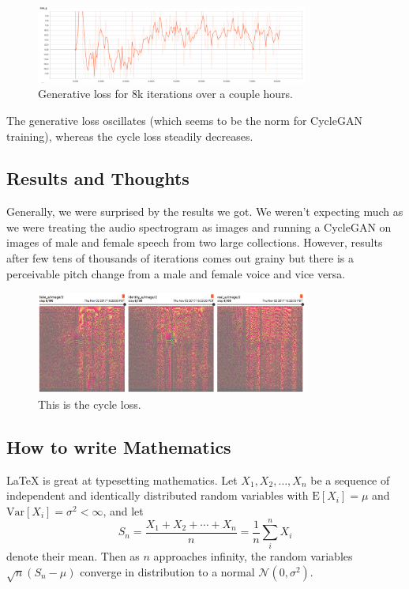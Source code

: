 \documentclass[a4paper]{article}
\begin{document}
\begin{figure}[!htb]
\centering
\includegraphics[width=0.8\textwidth]{cyclegan_genloss.png}
\caption{\label{fig:genloss}Generative loss for 8k iterations over a couple hours.}
\end{figure}

The generative loss oscillates (which seems to be the norm for CycleGAN training), whereas the cycle loss steadily decreases.

\subsection{Results and Thoughts}
Generally, we were surprised by the results we got. We weren't expecting much as we were treating the audio spectrogram as images and running a CycleGAN on images of male and female speech from two large collections. However, results after few tens of thousands of iterations comes out grainy but there is a perceivable pitch change from a male and female voice and vice versa.

\begin{figure}[!htb]
\centering
\includegraphics[width=0.8\textwidth]{a_prog_8k.png}
\caption{\label{fig:cycle_comparison}This is the cycle loss.}
\end{figure}

\subsection{How to write Mathematics}

\LaTeX{} is great at typesetting mathematics. Let $X_1, X_2, \ldots, X_n$ be a sequence of independent and identically distributed random variables with $\text{E}[X_i] = \mu$ and $\text{Var}[X_i] = \sigma^2 < \infty$, and let
\[S_n = \frac{X_1 + X_2 + \cdots + X_n}{n}
      = \frac{1}{n}\sum_{i}^{n} X_i\]
denote their mean. Then as $n$ approaches infinity, the random variables $\sqrt{n}(S_n - \mu)$ converge in distribution to a normal $\mathcal{N}(0, \sigma^2)$.
\end{document}
